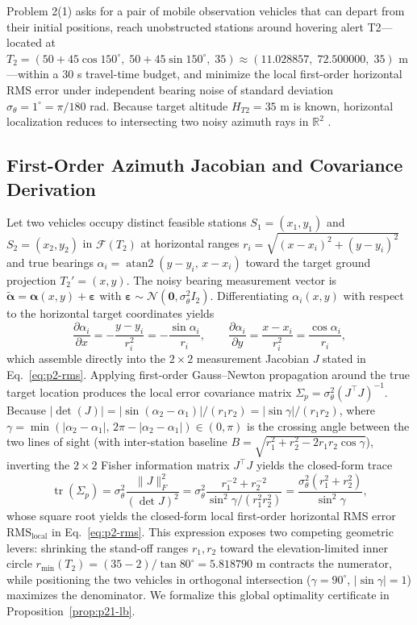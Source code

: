 Problem 2(1) asks for a pair of mobile observation vehicles that can depart from their initial positions, reach unobstructed stations around hovering alert T2—located at $T_2=(50+45\cos 150^\circ,\; 50+45\sin 150^\circ,\; 35)\approx(11.028857,\; 72.500000,\; 35)$ m—within a 30 s travel-time budget, and minimize the local first-order horizontal RMS error under independent bearing noise of standard deviation $\sigma_\theta=1^\circ=\pi/180$ rad. Because target altitude $H_{T2}=35$ m is known, horizontal localization reduces to intersecting two noisy azimuth rays in $\mathbb{R}^2$ \cite{bishop2010}.

\subsection{First-Order Azimuth Jacobian and Covariance Derivation}
Let two vehicles occupy distinct feasible stations $S_1=(x_1,y_1)$ and $S_2=(x_2,y_2)$ in $\mathcal{F}(T_2)$ at horizontal ranges $r_i=\sqrt{(x-x_i)^2+(y-y_i)^2}$ and true bearings $\alpha_i=\operatorname{atan2}(y-y_i,\,x-x_i)$ toward the target ground projection $T_2'=(x,y)$. The noisy bearing measurement vector is $\tilde{\boldsymbol{\alpha}}=\boldsymbol{\alpha}(x,y)+\boldsymbol{\varepsilon}$ with $\boldsymbol{\varepsilon}\sim\mathcal{N}(\mathbf{0},\sigma_\theta^2 I_2)$. Differentiating $\alpha_i(x,y)$ with respect to the horizontal target coordinates yields
\[
\frac{\partial \alpha_i}{\partial x} = -\frac{y - y_i}{r_i^2} = -\frac{\sin\alpha_i}{r_i}, \qquad
\frac{\partial \alpha_i}{\partial y} = \frac{x - x_i}{r_i^2} = \frac{\cos\alpha_i}{r_i},
\]
which assemble directly into the $2\times 2$ measurement Jacobian $J$ stated in Eq.~\eqref{eq:p2-rms}. Applying first-order Gauss--Newton propagation around the true target location produces the local error covariance matrix $\Sigma_p = \sigma_\theta^2 (J^\top J)^{-1}$. Because $|\det(J)| = |\sin(\alpha_2-\alpha_1)|/(r_1 r_2) = |\sin\gamma|/(r_1 r_2)$, where $\gamma = \min(|\alpha_2-\alpha_1|,\, 2\pi - |\alpha_2-\alpha_1|) \in (0,\pi)$ is the crossing angle between the two lines of sight (with inter-station baseline $B = \sqrt{r_1^2 + r_2^2 - 2r_1 r_2 \cos\gamma}$), inverting the $2\times 2$ Fisher information matrix $J^\top J$ yields the closed-form trace
\[
\operatorname{tr}(\Sigma_p) = \sigma_\theta^2 \frac{\|J\|_F^2}{(\det J)^2} = \sigma_\theta^2 \frac{r_1^{-2} + r_2^{-2}}{\sin^2\gamma / (r_1^2 r_2^2)} = \frac{\sigma_\theta^2 (r_1^2 + r_2^2)}{\sin^2\gamma},
\]
whose square root yields the closed-form local first-order horizontal RMS error $\mathrm{RMS}_{\mathrm{local}}$ in Eq.~\eqref{eq:p2-rms}. This expression exposes two competing geometric levers: shrinking the stand-off ranges $r_1,r_2$ toward the elevation-limited inner circle $r_{\min}(T_2)=(35-2)/\tan 80^\circ=5.818790$ m contracts the numerator, while positioning the two vehicles in orthogonal intersection ($\gamma=90^\circ$, $|\sin\gamma|=1$) maximizes the denominator. We formalize this global optimality certificate in Proposition~\ref{prop:p21-lb}.

